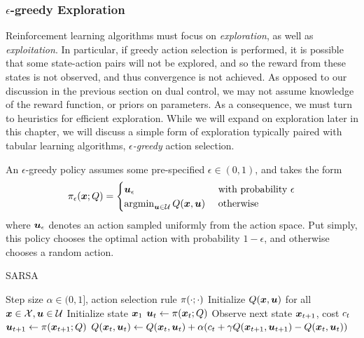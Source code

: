 \subsubsection{$\epsilon$-greedy Exploration}

Reinforcement learning algorithms must focus on \textit{exploration}, as well as \textit{exploitation}. In particular, if greedy action selection is performed, it is possible that some state-action pairs will not be explored, and so the reward from these states is not observed, and thus convergence is not achieved. As opposed to our discussion in the previous section on dual control, we may not assume knowledge of the reward function, or priors on parameters. As a consequence, we must turn to heuristics for efficient exploration. While we will expand on exploration later in this chapter, we will discuss a simple form of exploration typically paired with tabular learning algorithms, \textit{$\epsilon$-greedy} action selection. 

An $\epsilon$-greedy policy assumes some pre-specified $\epsilon \in (0,1)$, and takes the form
\begin{align}
    \pi_{\epsilon}(\bm{x}; Q) = \begin{cases}
    \bm{u}_\epsilon \,\, &\text{with probability}\,\, \epsilon\\
    \text{argmin}_{\bm{u} \in \mathcal{U}} \, Q(\bm{x},\bm{u})\,\, &\text{otherwise}
    \end{cases}
\end{align}
where $\bm{u}_{\epsilon}$ denotes an action sampled uniformly from the action space. Put simply, this policy chooses the optimal action with probability $1-\epsilon$, and otherwise chooses a random action. 

\begin{algorithm}[t]
\caption{SARSA}
\centering
\label{alg:SARSA}

\begin{algorithmic}[1]
    \Require Step size $\alpha \in (0,1]$, action selection rule $\pi(\cdot; \cdot)$
    \State Initialize $Q(\bm{x},\bm{u})$ for all $\bm{x} \in \mathcal{X}, \bm{u} \in \mathcal{U}$
        \State Initialize state $\bm{x}_1$
        \State $\bm{u}_t \gets \pi(\bm{x}_t; Q)$
            \State Observe next state $\bm{x}_{t+1}$, cost $c_{t}$
            \State $\bm{u}_{t+1} \gets \pi(\bm{x}_{t+1}; Q)$
            \State $Q(\bm{x}_t,\bm{u}_t) \gets Q(\bm{x}_t,\bm{u}_t) + \alpha (c_t + \gamma Q(\bm{x}_{t+1},\bm{u}_{t+1}) - Q(\bm{x}_t,\bm{u}_t))$
        \EndFor
    \EndFor
\end{algorithmic}
\end{algorithm}


